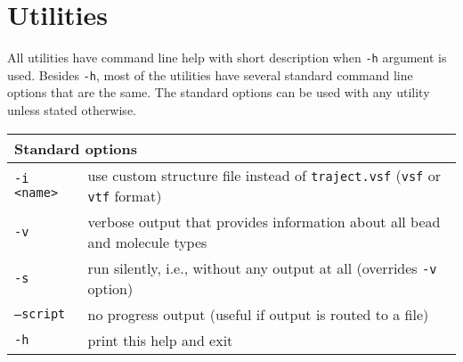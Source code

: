 \chapter{Utilities} \label{chap:Utils}

All utilities have command line help with short description when
\texttt{-h} argument is used. Besides \texttt{-h}, most of the utilities
have several standard command line options that are the same. The standard
options can be used with any utility unless stated otherwise.

\vspace{1em}
\noindent
\begin{tabular}{p{}p{}}
  \toprule
  \multicolumn{2}{l}{Standard options} \\
  \midrule
  \texttt{-i <name>} & use custom structure file instead of
    \texttt{traject.vsf} (\texttt{vsf} or \texttt{vtf} format) \\
  \texttt{-v}        & verbose output that provides information about all
    bead and molecule types \\
  \texttt{-s}        & run silently, i.e., without any output at all
    (overrides \texttt{-v} option) \\
  \texttt{--script}  & no progress output (useful if output is routed to a
    file) \\
  \texttt{-h}        & print this help and exit \\
  \bottomrule
\end{tabular}




























